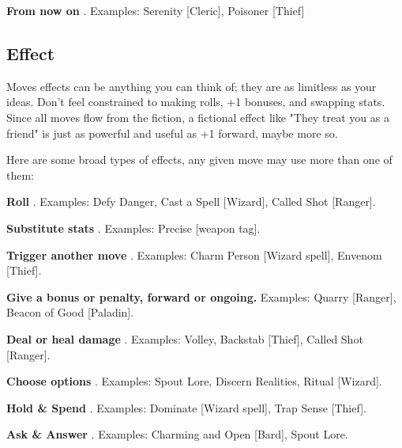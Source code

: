          
\item            {\bf From now on} . Examples: Serenity [Cleric], Poisoner [Thief]

       
\stopitemize
       
\subsection{Effect}   
       

Moves effects can be anything you can think of; they are as limitless as your ideas. Don't feel constrained to making rolls, +1 bonuses, and swapping stats. Since all moves flow from the fiction, a fictional effect like "They treat you as a friend" is just as powerful and useful as +1 forward, maybe more so.

       

Here are some broad types of effects, any given move may use more than one of them:

       
\startitemize[1,packed]
         
\item            {\bf Roll} . Examples: Defy Danger, Cast a Spell [Wizard], Called Shot [Ranger].

         
\item            {\bf Substitute stats} . Examples: Precise [weapon tag].

         
\item            {\bf Trigger another move} . Examples: Charm Person [Wizard spell], Envenom [Thief].

         
\item            {\bf Give a bonus or penalty, forward or ongoing.}  Examples: Quarry [Ranger], Beacon of Good [Paladin].

         
\item            {\bf Deal or heal damage} . Examples: Volley, Backstab [Thief], Called Shot [Ranger].

         
\item            {\bf Choose options} . Examples: Spout Lore, Discern Realities, Ritual [Wizard].

         
\item            {\bf Hold \& Spend} . Examples: Dominate [Wizard spell], Trap Sense [Thief].

         
\item            {\bf Ask \& Answer} . Examples: Charming and Open [Bard], Spout Lore.

